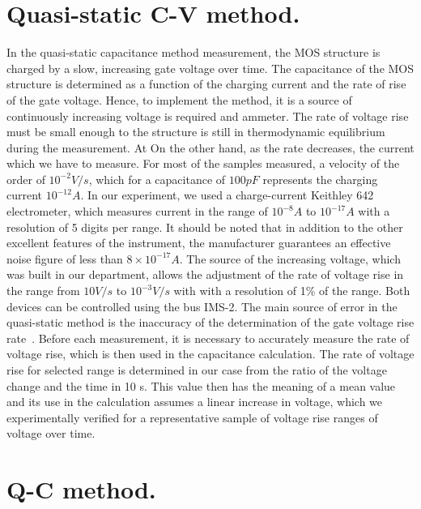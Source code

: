 \section{Quasi-static C-V method.}\label{sec:3.2}

In the quasi-static capacitance method measurement, the MOS structure
is charged by a slow, increasing gate voltage over time. The
capacitance of the MOS structure is determined as a function of the
charging current and the rate of rise of the gate voltage.  Hence, to
implement the method, it is a source of continuously increasing
voltage is required and ammeter. The rate of voltage rise must be
small enough to the structure is still in thermodynamic equilibrium
during the measurement. At On the other hand, as the rate decreases,
the current which we have to measure. For most of the samples
measured, a velocity of the order of $10^{-2}V/s$, which for a
capacitance of $100pF$ represents the charging current $10^{-12}A$. In
our experiment, we used a charge-current Keithley 642 electrometer,
which measures current in the range of $10^{-8}A$ to $10^{-17}A$ with
a resolution of 5 digits per range.  It should be noted that in
addition to the other excellent features of the instrument, the
manufacturer guarantees an effective noise figure of less than
$8\times10^{-17}A$. The source of the increasing voltage, which was
built in our department, allows the adjustment of the rate of voltage
rise in the range from $10V/s$ to $10^{-3}V/s$ with with a resolution
of 1\% of the range. Both devices can be controlled using the bus
IMS-2.  The main source of error in the quasi-static method is the
inaccuracy of the determination of the gate voltage rise
rate~\cite{1.5}. Before each measurement, it is necessary to
accurately measure the rate of voltage rise, which is then used in the
capacitance calculation. The rate of voltage rise for selected range
is determined in our case from the ratio of the voltage change and the
time in 10 s. This value then has the meaning of a mean value and its
use in the calculation assumes a linear increase in voltage, which we
experimentally verified for a representative sample of voltage rise
ranges of voltage over time.

\section{Q-C method.}\label{sec:3.3}

